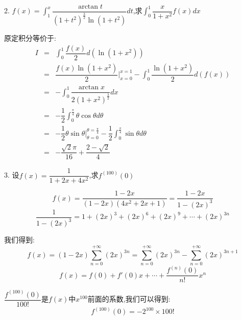 2. $f(x)=\int_{1}^{x}\dfrac{\arctan t}{(1+t^2)^{\frac{3}{2}}\ln(1+t^2)}dt$,求$\int_{0}^{1}\dfrac{x}{1+x^2}f(x)dx$
\begin{solution}

	原定积分等价于:  
	\begin{eqnarray*}
		I&=&\int_{0}^{1}\dfrac{f(x)}{2}d(\ln(1+x^2))\\
		&=&\dfrac{f(x)\ln(1+x^2)}{2}|_{x=0}^{x=1}-\int_{0}^{1}\dfrac{\ln(1+x^2)}{2}d(f(x))\\
		&=&-\int_{0}^{1}\dfrac{\arctan x}{2(1+x^2)^{\frac{3}{2}}}dx\\
		&=&-\dfrac{1}{2}\int_{0}^{\frac{\pi}{4}}\theta\cos\theta d\theta\\
		&=&-\dfrac{1}{2}\theta\sin\theta|_{\theta=0}^{\theta=\frac{\pi}{4}}-\dfrac{1}{2}\int_{0}^{\frac{\pi}{4}}\sin \theta d\theta\\
		&=&-\dfrac{\sqrt{2}\pi}{16}+\dfrac{2-\sqrt{2}}{4}
	\end{eqnarray*}
\end{solution}

3. 设$f(x)=\dfrac{1}{1+2x+4x^2}$,求$f^{(100)}(0)$
\begin{solution}

	$$f(x)=\dfrac{1-2x}{(1-2x)(4x^2+2x+1)}=\dfrac{1-2x}{1-(2x)^3}$$
	$$\dfrac{1}{1-(2x)^3}=1+(2x)^3+(2x)^6+(2x)^9+\cdots+(2x)^{3n}$$
	
	我们得到:$$f(x)=(1-2x)\sum\limits_{n=0}^{+\infty}(2x)^{3n}=\sum\limits_{n=0}^{+\infty}(2x)^{3n}-\sum\limits_{n=0}^{+\infty}(2x)^{3n+1}$$
	$$f(x)=f(0)+f'(0)x+\cdots+\dfrac{f^{(n)}(0)}{n!}x^n$$
	
	$\dfrac{f^{(100)}(0)}{100!}$是$f(x)$中$x^{100}$前面的系数,我们可以得到:  
	$$f^{(100)}(0)=-2^{100}\times100!$$
\end{solution}

